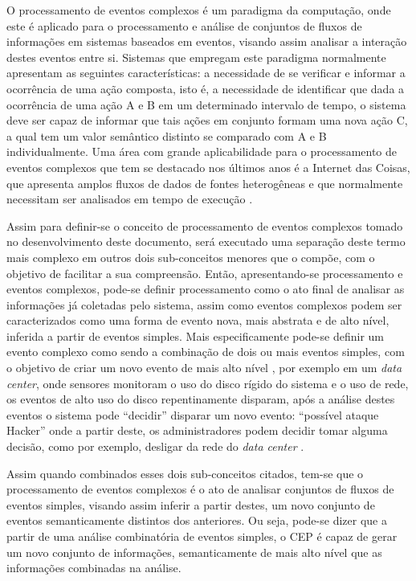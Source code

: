 \documentclass[ti,table]{texufpel} %
\begin{document}
O processamento de eventos complexos é um paradigma da computação, onde este é aplicado para o processamento e análise de conjuntos de fluxos de informações em sistemas baseados em eventos, visando assim analisar a interação destes eventos entre si. Sistemas que empregam este paradigma normalmente apresentam as seguintes características: a necessidade de se verificar e informar a ocorrência de uma ação composta, isto é, a necessidade de identificar que dada a ocorrência de uma ação A e B em um determinado intervalo de tempo, o sistema deve ser capaz de informar que tais ações em conjunto formam uma nova ação C, a qual tem um valor semântico distinto se comparado com A e B individualmente. Uma área com grande aplicabilidade para o processamento de eventos complexos que tem se destacado nos últimos anos é a Internet das Coisas, que apresenta amplos fluxos de dados de fontes heterogêneas e que normalmente necessitam ser analisados em tempo de execução \cite{jun2014design}.  

  

Assim para definir-se o conceito de processamento de eventos complexos tomado no desenvolvimento deste documento, será executado uma separação deste termo mais complexo em outros dois sub-conceitos menores que o compõe, com o objetivo de facilitar a sua compreensão. Então, apresentando-se processamento e eventos complexos, pode-se definir processamento como o ato final de analisar as informações já coletadas pelo sistema, assim como eventos complexos podem ser caracterizados como uma forma de evento nova, mais abstrata e de alto nível, inferida a partir de eventos simples. Mais especificamente pode-se definir um evento complexo como sendo a combinação de dois ou mais eventos simples, com o objetivo de criar um novo evento de mais alto nível \cite{dayarathna2018recent}, por exemplo em um \textit{data center}, onde sensores monitoram o uso do disco rígido do sistema e o uso de rede, os eventos de alto uso do disco repentinamente disparam, após a análise destes eventos o sistema pode ``decidir'' disparar um novo evento: ``possível ataque Hacker'' onde a partir deste, os administradores podem decidir tomar alguma decisão, como por exemplo, desligar da rede do \textit{data center} \cite{wu2006high}.  

  

Assim quando combinados esses dois sub-conceitos citados, tem-se que o processamento de eventos complexos é o ato de analisar conjuntos de fluxos de eventos simples, visando assim inferir a partir destes, um novo conjunto de eventos semanticamente distintos dos anteriores. Ou seja, pode-se dizer que a partir de uma análise combinatória de eventos simples, o CEP é capaz de gerar um novo conjunto de informações, semanticamente de mais alto nível que as informações combinadas na análise. 
\end{document}
